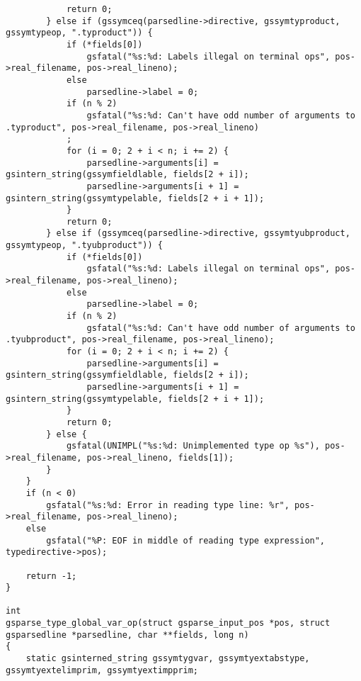 \documentclass{report}
\begin{document}
\begin{verbatim}
            return 0;
        } else if (gssymceq(parsedline->directive, gssymtyproduct, gssymtypeop, ".typroduct")) {
            if (*fields[0])
                gsfatal("%s:%d: Labels illegal on terminal ops", pos->real_filename, pos->real_lineno);
            else
                parsedline->label = 0;
            if (n % 2)
                gsfatal("%s:%d: Can't have odd number of arguments to .typroduct", pos->real_filename, pos->real_lineno)
            ;
            for (i = 0; 2 + i < n; i += 2) {
                parsedline->arguments[i] = gsintern_string(gssymfieldlable, fields[2 + i]);
                parsedline->arguments[i + 1] = gsintern_string(gssymtypelable, fields[2 + i + 1]);
            }
            return 0;
        } else if (gssymceq(parsedline->directive, gssymtyubproduct, gssymtypeop, ".tyubproduct")) {
            if (*fields[0])
                gsfatal("%s:%d: Labels illegal on terminal ops", pos->real_filename, pos->real_lineno);
            else
                parsedline->label = 0;
            if (n % 2)
                gsfatal("%s:%d: Can't have odd number of arguments to .tyubproduct", pos->real_filename, pos->real_lineno);
            for (i = 0; 2 + i < n; i += 2) {
                parsedline->arguments[i] = gsintern_string(gssymfieldlable, fields[2 + i]);
                parsedline->arguments[i + 1] = gsintern_string(gssymtypelable, fields[2 + i + 1]);
            }
            return 0;
        } else {
            gsfatal(UNIMPL("%s:%d: Unimplemented type op %s"), pos->real_filename, pos->real_lineno, fields[1]);
        }
    }
    if (n < 0)
        gsfatal("%s:%d: Error in reading type line: %r", pos->real_filename, pos->real_lineno);
    else
        gsfatal("%P: EOF in middle of reading type expression", typedirective->pos);

    return -1;
}

int
gsparse_type_global_var_op(struct gsparse_input_pos *pos, struct gsparsedline *parsedline, char **fields, long n)
{
    static gsinterned_string gssymtygvar, gssymtyextabstype, gssymtyextelimprim, gssymtyextimpprim;


\end{verbatim}
\end{document}
